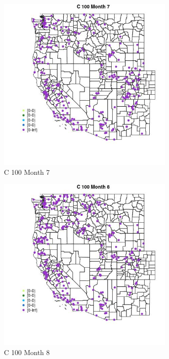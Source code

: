 \begin{figure} 
\centering  
\includegraphics[width=0.77\textwidth]{Code_Outputs/Report_ML_input_PM25_Step4_part_e_de_duplicated_aveswNAs_MapObsMo7C_100.jpg} 
\caption{\label{fig:Report_ML_input_PM25_Step4_part_e_de_duplicated_aveswNAsMapObsMo7C_100}C 100 Month 7} 
\end{figure} 
 

\begin{figure} 
\centering  
\includegraphics[width=0.77\textwidth]{Code_Outputs/Report_ML_input_PM25_Step4_part_e_de_duplicated_aveswNAs_MapObsMo8C_100.jpg} 
\caption{\label{fig:Report_ML_input_PM25_Step4_part_e_de_duplicated_aveswNAsMapObsMo8C_100}C 100 Month 8} 
\end{figure} 
 

